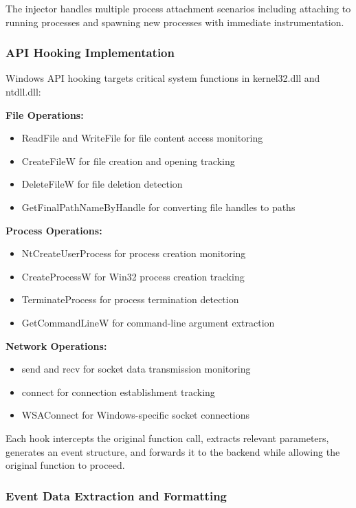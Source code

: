 The injector handles multiple process attachment scenarios including attaching to running processes and spawning new processes with immediate instrumentation.

\subsubsection{API Hooking Implementation}

Windows API hooking targets critical system functions in kernel32.dll and ntdll.dll:

\textbf{File Operations:}
\begin{itemize}
    \item ReadFile and WriteFile for file content access monitoring
    \item CreateFileW for file creation and opening tracking
    \item DeleteFileW for file deletion detection
    \item GetFinalPathNameByHandle for converting file handles to paths
\end{itemize}

\textbf{Process Operations:}
\begin{itemize}
    \item NtCreateUserProcess for process creation monitoring
    \item CreateProcessW for Win32 process creation tracking
    \item TerminateProcess for process termination detection
    \item GetCommandLineW for command-line argument extraction
\end{itemize}

\textbf{Network Operations:}
\begin{itemize}
    \item send and recv for socket data transmission monitoring
    \item connect for connection establishment tracking
    \item WSAConnect for Windows-specific socket connections
\end{itemize}

Each hook intercepts the original function call, extracts relevant parameters, generates an event structure, and forwards it to the backend while allowing the original function to proceed.

\subsubsection{Event Data Extraction and Formatting}

